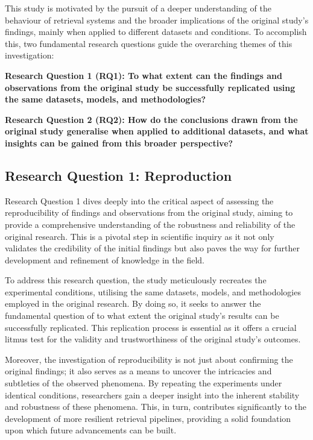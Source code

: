 This study is motivated by the pursuit of a deeper understanding of the behaviour of retrieval systems and the broader implications of the original study's findings, mainly when applied to different datasets and conditions. To accomplish this, two fundamental research questions guide the overarching themes of this investigation:

\textbf{Research Question 1 (RQ1): To what extent can the findings and observations from the original study be successfully replicated using the same datasets, models, and methodologies?}

\textbf{Research Question 2 (RQ2): How do the conclusions drawn from the original study generalise when applied to additional datasets, and what insights can be gained from this broader perspective?} 

\subsection{Research Question 1: Reproduction}
Research Question 1 dives deeply into the critical aspect of assessing the reproducibility of findings and observations from the original study, aiming to provide a comprehensive understanding of the robustness and reliability of the original research. This is a pivotal step in scientific inquiry as it not only validates the credibility of the initial findings but also paves the way for further development and refinement of knowledge in the field.

To address this research question, the study meticulously recreates the experimental conditions, utilising the same datasets, models, and methodologies employed in the original research. By doing so, it seeks to answer the fundamental question of to what extent the original study's results can be successfully replicated. This replication process is essential as it offers a crucial litmus test for the validity and trustworthiness of the original study's outcomes.

Moreover, the investigation of reproducibility is not just about confirming the original findings; it also serves as a means to uncover the intricacies and subtleties of the observed phenomena. By repeating the experiments under identical conditions, researchers gain a deeper insight into the inherent stability and robustness of these phenomena. This, in turn, contributes significantly to the development of more resilient retrieval pipelines, providing a solid foundation upon which future advancements can be built.

